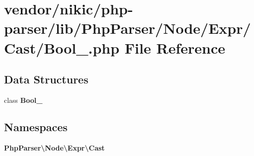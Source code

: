 \section{vendor/nikic/php-\/parser/lib/\+Php\+Parser/\+Node/\+Expr/\+Cast/\+Bool\+\_\+.php File Reference}
\label{_bool___8php}
\subsection*{Data Structures}
\begin{DoxyCompactItemize}
\item 
class {\bf Bool\+\_\+}
\end{DoxyCompactItemize}
\subsection*{Namespaces}
\begin{DoxyCompactItemize}
\item 
 {\bf Php\+Parser\textbackslash{}\+Node\textbackslash{}\+Expr\textbackslash{}\+Cast}
\end{DoxyCompactItemize}
